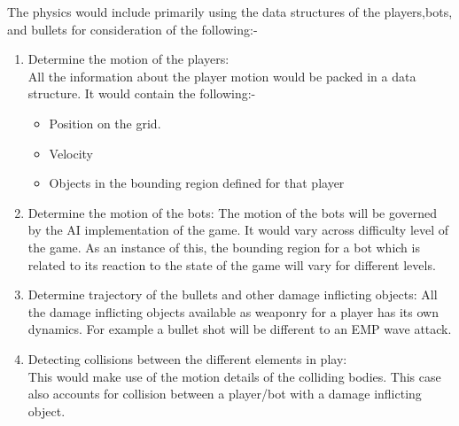 \documentclass[ebook,12pt,oneside,openany]{article}
\begin{document}
The physics would include primarily using the data structures of the players,bots, and bullets for consideration of the following:-

\begin{enumerate}
\item Determine the motion of the players:\\
All the information about the player motion would be packed in a data  structure. It would contain the following:-
\begin{itemize}
\item Position on the grid.
\item Velocity
\item Objects in the bounding region defined for that player

\end{itemize}

\item Determine the motion of the bots:
The motion of the bots will be governed by the AI implementation of the game. It would vary across difficulty level of the game. As an instance of this, the bounding region for a bot which is related to its reaction to the state of the game will vary for different levels. 
\item Determine trajectory of the bullets and other damage inflicting objects:
All the damage inflicting objects available as weaponry for a player has its own dynamics. For example a bullet shot will be different to an EMP wave attack.
\item Detecting collisions between the different elements in play:\\
This would make use of the motion details of the colliding bodies. This case also accounts for collision between a player/bot with a damage inflicting object.


\end {enumerate}
\end{document}
